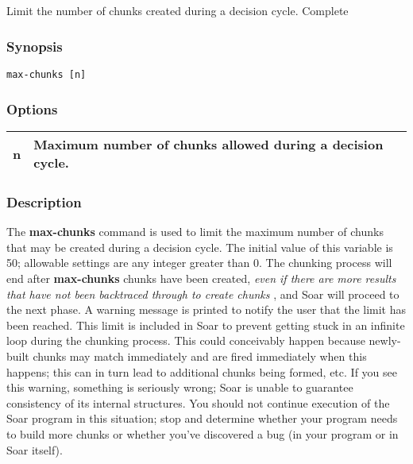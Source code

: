 \subsection{}
\label{max-chunks}
Limit the number of chunks created during a decision cycle. 
 Complete
\subsubsection*{Synopsis}
\begin{verbatim}
max-chunks [n]
\end{verbatim}
\subsubsection*{Options}
\begin{tabular}{|l|l|}
\hline 
 n  & Maximum number of chunks allowed during a decision cycle.  \\
 \hline 
\end{tabular}
\subsubsection*{Description}
 The \textbf{max-chunks}
 command is used to limit the maximum number of chunks that may be created during a decision cycle. The initial value of this variable is 50; allowable settings are any integer greater than 0. 
 The chunking process will end after \textbf{max-chunks}
 chunks have been created, \emph{even if there are more results that have not been backtraced through to create chunks}
, and Soar will proceed to the next phase. A warning message is printed to notify the user that the limit has been reached. 
 This limit is included in Soar to prevent getting stuck in an infinite loop during the chunking process. This could conceivably happen because newly-built chunks may match immediately and are fired immediately when this happens; this can in turn lead to additional chunks being formed, etc. If you see this warning, something is seriously wrong; Soar is unable to guarantee consistency of its internal structures. You should not continue execution of the Soar program in this situation; stop and determine whether your program needs to build more chunks or whether you've discovered a bug (in your program or in Soar itself). 
